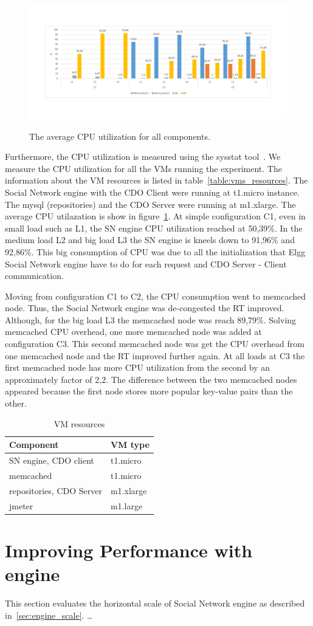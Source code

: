 \begin{figure}[h]
	\caption{The average CPU utilization for all components.}
	\includegraphics[width=1\textwidth,natwidth=200,natheight=150]{./fig/UsageAVG.pdf}
	\centering
	\label{fig:cpuavg}
\end{figure}

Furthermore, the CPU utilization is measured using the sysstat tool~\cite{sysstat_url}. We measure the CPU utilization for all the VMs running the experiment. The information about the VM resources is listed in table~\ref{table:vms_resources}. The Social Network engine with the CDO Client were running at t1.micro instance. The mysql (repositories) and the CDO Server were running at m1.xlarge. The average CPU utilazation is show in figure~\ref{fig:cpuavg}. At simple configuration C1, even in small load such as L1, the SN engine CPU utilization reached at 50,39\%. In the medium load L2 and big load L3 the SN engine is kneels down to 91,96\% and 92,86\%. This big consumption of CPU was due to all the initialization that Elgg Social Network engine have to do for each request and CDO Server - Client communication.

Moving from configuration C1 to C2, the CPU consumption went to memcached node. Thus, the Social Network engine was de-congested the RT improved. Although, for the big load L3 the memcached node was reach 89,79\%. Solving memcached CPU overhead, one more memcached node was added at configuration C3. This second memcached node was get the CPU overhead from one memcached node and the RT improved further again. At all loads at C3 the first memcached node has more CPU utilization from the second by an approximately factor of 2,2. The difference between the two memcached nodes appeared because the first node stores more popular key-value pairs than the other.

\begin{table}[]
\label{table:vms_resources}
\centering
\caption{VM resources}
\label{my-label}
\begin{tabular}{|l|l|}
\hline
 Component &  VM type \\ \hline
 SN engine, CDO client &  t1.micro \\ \hline
 memcached &  t1.micro \\ \hline
 repositories, CDO Server &  m1.xlarge \\ \hline
 jmeter &  m1.large \\ \hline
\end{tabular}
\end{table}

\section{Improving Performance with engine}
This section evaluates the horizontal scale of Social Network engine as described in~\ref{sec:engine_scale}. \ldots
